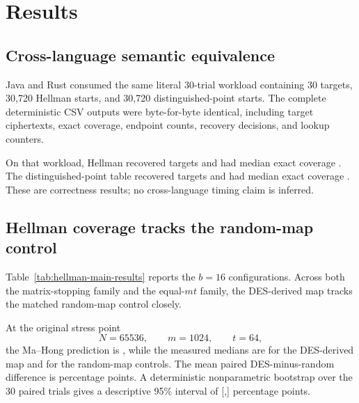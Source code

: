 \section{Results}
\label{sec:results}

\subsection{Cross-language semantic equivalence}

Java and Rust consumed the same literal 30-trial workload containing 30
targets, 30,720 Hellman starts, and 30,720 distinguished-point starts. The
complete deterministic CSV outputs were byte-for-byte identical, including
target ciphertexts, exact coverage, endpoint counts, recovery decisions, and
lookup counters.

On that workload, Hellman recovered \SharedHellmanSuccess{} targets and had
median exact coverage \SharedHellmanCoverage{}. The distinguished-point table
recovered \SharedDPSuccess{} targets and had median exact coverage
\SharedDPCoverage{}. These are correctness results; no cross-language timing
claim is inferred.

\subsection{Hellman coverage tracks the random-map control}

Table~\ref{tab:hellman-main-results} reports the $b=16$ configurations. Across
both the matrix-stopping family and the equal-$mt$ family, the DES-derived map
tracks the matched random-map control closely.

\begin{table}[ht]
\centering
\small

\caption{Measured median exact Hellman coverage over 30 trials for the
DES-derived mapping and matched random mappings. Ma--Hong is the
random-function prediction from Eq.~\eqref{eq:ma-hong-state-fraction}.}
\label{tab:hellman-main-results}
\end{table}

At the original stress point
\[
  N=65536,\qquad m=1024,\qquad t=64,
\]
the Ma--Hong prediction is \StressMH{}, while the measured medians are
\StressDES{} for the DES-derived map and \StressRandom{} for the random-map
controls. The mean paired DES-minus-random difference is
\StressPairedMeanPP{} percentage points. A deterministic nonparametric
bootstrap over the 30 paired trials gives a descriptive 95\% interval of
[\StressPairedCILowPP{},\StressPairedCIHighPP{}] percentage points.

